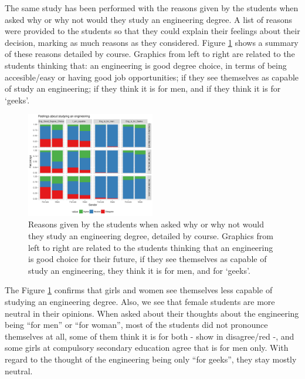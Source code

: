 \documentclass[journal,transmag]{IEEEtran}
\begin{document}
The same study has been performed with the reasons given by the students when asked why or why not would they study an engineering degree. A list of reasons were provided to the students so that they could explain their feelings about their decision, marking as much reasons as they considered. Figure \ref{fig:opinionsEng} shows a summary of these reasons detailed by course. Graphics from left to right are related to the students thinking that: an engineering is good degree choice, in terms of being accesible/easy or having good job opportunities; if they see themselves as capable of study an engineering; if they think it is for men, and if they think it is for `geeks'.

\begin{figure}
	\centering
	\includegraphics[width=0.5\textwidth]{img/engineering_opinions.pdf}
	\caption{Reasons given by the students when asked why or why not would they study an engineering degree, detailed by course. Graphics from left to right are related to the students thinking that an engineering is good choice for their future, if they see themselves as capable of study an engineering, they think it is for men, and for `geeks'.}
	\label{fig:opinionsEng}
\end{figure}

The Figure \ref{fig:opinionsEng} confirms that girls and women see themselves less capable of studying an engineering degree. Also, we see that female students are more neutral in their opinions. When asked about their thoughts about the engineering being ``for men'' or ``for woman'', most of the students did not pronounce themselves at all, some of them think it is for both - show in disagree/red -, and some girls at compulsory secondary education agree that is for men only. With regard to the thought of the engineering being only ``for geeks'', they stay mostly neutral.
\end{document}
